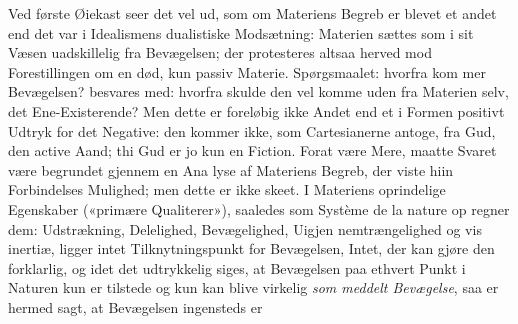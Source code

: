 \documentclass[12pt,a4paper]{book}
\begin{document}
Ved første Øiekast seer det vel ud, som om Materiens
Begreb er blevet et andet end det var i Idealismens dualistiske
Modsætning: Materien sættes som i sit Væsen uadskillelig fra
Bevægelsen; der protesteres altsaa herved mod Forestillingen
om en død, kun passiv Materie. Spørgsmaalet: hvorfra kom\-%
mer Bevægelsen? besvares med: hvorfra skulde den vel komme
uden fra Materien selv, det Ene-Existerende? Men dette er
foreløbig ikke Andet end et i Formen positivt Udtryk for det
Negative: den kommer ikke, som Cartesianerne antoge, fra
Gud, den active Aand; thi Gud er jo kun en Fiction. Forat
være Mere, maatte Svaret være begrundet gjennem en Ana\-%
lyse af Materiens Begreb, der viste hiin Forbindelses Mulighed;
men dette er ikke skeet. I Materiens oprindelige Egenskaber
(«primære Qualiterer»), saaledes som Système de la nature op\-%
regner dem: Udstrækning, Delelighed, Bevægelighed, Uigjen\-%
nemtrængelighed og vis inertiæ, ligger intet Tilknytningspunkt
for Bevægelsen, Intet, der kan gjøre den forklarlig, og idet det
udtrykkelig siges, at Bevægelsen paa ethvert Punkt i Naturen
kun er tilstede og kun kan blive virkelig \emph{som meddelt
Bevægelse}, saa er hermed sagt, at Bevægelsen ingensteds er
\end{document}

